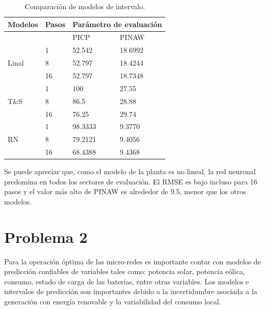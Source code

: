 \documentclass[12pt]{article}
\begin{document}
\begin{table}[htbp]
  \centering
  \caption{Comparación de modelos de intervalo.}
\begin{tabular}{|l|l|l|l|}
	\hline
	Modelos                & Pasos & \multicolumn{2}{l|}{Parámetro de evaluación} \\ \hline
	\multicolumn{2}{|l|}{}         & PICP                  & PINAW                \\ \hline
	\multirow{3}{*}{Linal} & 1     & 52.542                & 18.6992              \\ \cline{2-4}
	& 8     & 52.797                & 18.4244              \\ \cline{2-4}
	& 16    & 52.797                & 18.7348              \\ \hline
	\multirow{3}{*}{T\&S}  & 1     & 100                   & 27.55                \\ \cline{2-4}
	& 8     & 86.5                  & 28.88                \\ \cline{2-4}
	& 16    & 76.25                 & 29.74                \\ \hline
	\multirow{3}{*}{RN}    & 1     & 98.3333               & 9.3770               \\ \cline{2-4}
	& 8     & 79.2121               & 9.4056               \\ \cline{2-4}
	& 16    & 68.4388               & 9.4368               \\ \hline
\end{tabular}
  \label{t_CompCov}%
\end{table}%

Se puede apreciar que, como el modelo de la planta es no lineal, la red neuronal predomina en todos los sectores de evaluación. El RMSE es bajo incluso para 16 pasos y el valor más alto de PINAW es alrededor de 9.5, menor que los otros modelos.



\section{Problema 2}
Para la operación óptima de las micro-redes es importante contar con modelos de predicción confiables de variables tales como: potencia solar, potencia eólica, consumo, estado de carga de las baterías, entre otras variables. Los modelos e intervalos de predicción son importantes debido a la incertidumbre asociada a la generación con energía renovable y la variabilidad del consumo local.
\end{document}
